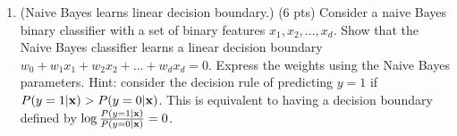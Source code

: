 \documentclass{article}
\def\x{{\bf x}}
\begin{document}
\begin{enumerate}
\begin{enumerate}

\end{enumerate}

\item (Naive Bayes learns linear decision boundary.) (6 pts) Consider a naive 
Bayes binary classifier with a set of binary features $x_1, x_2, ...,x_d$. Show 
that the Naive Bayes classifier learns a linear decision boundary 
$w_0+w_1x_1+w_2x_2+...+w_dx_d=0$. Express the weights using the Naive Bayes 
parameters. Hint: consider the decision rule of predicting 
$y=1$ if $P(y=1|\x) > P(y=0|\x)$. This is equivalent to having a decision 
boundary defined by $\log\frac{P(y=1|\x)}{P(y=0|\x)}=0$.

\end{enumerate}
\end{document}

